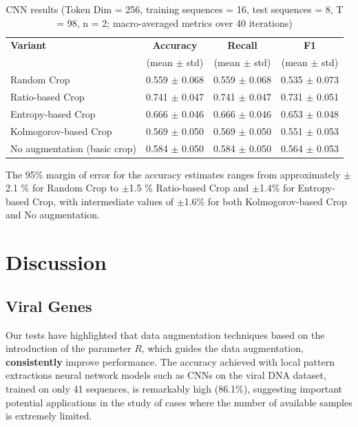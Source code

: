 \documentclass{article}
\theoremstyle{remark}
\begin{document}
\begin{table}[H]
\centering
\caption{CNN results (Token Dim = 256, training sequences = 16, test sequences = 8, T = 98, n = 2; macro-averaged metrics over 40 iterations)}
\begin{tabular}{l c c c}
\hline
\textbf{Variant}             & \textbf{Accuracy}       & \textbf{Recall}          & \textbf{F1}               \\
                             & (mean $\pm$ std)            & (mean $\pm$ std)             & (mean $\pm$ std)              \\
\hline
Random Crop                  & 0.559 $\pm$ 0.068           & 0.559 $\pm$ 0.068            & 0.535 $\pm$ 0.073             \\
Ratio-based Crop             & 0.741 $\pm$ 0.047           & 0.741 $\pm$ 0.047            & 0.731 $\pm$ 0.051             \\
Entropy-based Crop           & 0.666 $\pm$ 0.046           & 0.666 $\pm$ 0.046            & 0.653 $\pm$ 0.048             \\
Kolmogorov-based Crop        & 0.569 $\pm$ 0.050           & 0.569 $\pm$ 0.050            & 0.551 $\pm$ 0.053             \\
No augmentation (basic crop) & 0.584 $\pm$ 0.050           & 0.584 $\pm$ 0.050            & 0.564 $\pm$ 0.053             \\
\hline
\end{tabular}
\end{table}

\noindent

The 95\% margin of error for the accuracy estimates ranges from approximately $\pm$2.1 \% for Random Crop to $\pm$1.5 \% Ratio-based Crop and $\pm$1.4\% for Entropy-based Crop, with intermediate values of $\pm$1.6\% for both Kolmogorov-based Crop and No augmentation.

\section{Discussion}
\subsection{Viral Genes}
Our tests have highlighted that data augmentation techniques based on the introduction of the parameter \(R\), which guides the data augmentation, \textbf{consistently} improve performance. The accuracy achieved with local pattern extractions neural network models such as CNNs on the viral DNA dataset, trained on only 41 sequences, is remarkably high (86.1\%), suggesting important potential applications in the study of cases where the number of available samples is extremely limited. 
\end{document}
